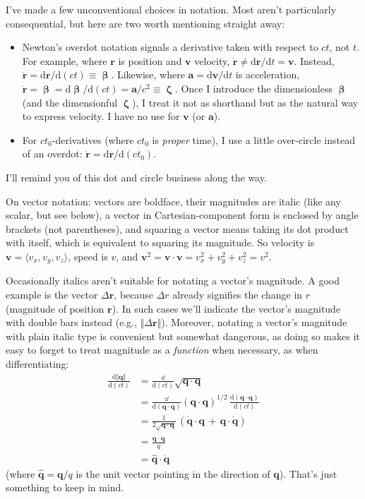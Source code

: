 \documentclass[12pt]{article}
\renewcommand{\vv}[1]{\mathbf{#1}}
\newcommand{\dd}[1]{\mathrm{d}#1}
\newcommand{\vvbeta}{\bm{\upbeta}}
\newcommand{\vvzeta}{\bm{\upzeta}}
\begin{document}
I've made a few unconventional choices in notation. Most aren't particularly consequential, but here are two worth mentioning straight away:
\begin{itemize}
\item Newton's overdot notation signals a derivative taken with respect to $ct$, not $t$. For example, where $\vv r$ is position and $\vv v$ velocity, ${\dot{\vv r} \neq \dd \vv r / \dd t = \vv v}$. Instead, $\dot{\vv r} = \dd \vv r / \dd (ct) \equiv \vvbeta$. Likewise, where $\vv a = \dd \vv v / \dd t$ is acceleration, $\ddot{\vv r} = \dot{\vvbeta} = \dd \vvbeta / \dd (ct) = \vv a / c^2 \equiv \vvzeta$. Once I introduce the dimensionless $\vvbeta$ (and the dimensionful $\vvzeta$), I treat it not as shorthand but as the natural way to express velocity. I have no use for $\vv v$ (or $\vv a$).
\item For $c t_0$-derivatives (where $ct_0$ is \emph{proper} time), I use a little over-circle instead of an overdot: $\mathring{\vv r} = \dd \vv r / \dd (c t_0)$.
\end{itemize}
I'll remind you of this dot and circle business along the way.

On vector notation: vectors are boldface, their magnitudes are italic (like any scalar, but see below), a vector in Cartesian-component form is enclosed by angle brackets (not parentheses), and squaring a vector means taking its dot product with itself, which is equivalent to squaring its magnitude. So velocity is $\vv v = \langle v_x, v_y, v_z \rangle$, speed is $v$, and $\vv v^2 = \vv v \cdot \vv v = v_x^2 + v_y^2 + v_z^2 = v^2$.

Occasionally italics aren't suitable for notating a vector's magnitude. A good example is the vector $\Delta \vv r$, because $\Delta r$ already signifies the change in $r$ (magnitude of position $\vv r$). In such cases we'll indicate the vector's magnitude with double bars instead (e.g., $\Vert \Delta \vv r \Vert$). Moreover, notating a vector's magnitude with plain italic type is convenient but somewhat dangerous, as doing so makes it easy to forget to treat magnitude as a \emph{function} when necessary, as when differentiating:
\begin{equation*}
\begin{aligned}
\frac{\dd \Vert \vv q \Vert}{\dd (ct)} &= \frac{\dd}{\dd (ct)} \sqrt{ \vv q \cdot \vv q } \\[2pt]
&= \frac{\dd}{\dd (\vv q \cdot \vv q)} \left( \vv q \cdot \vv q \right) ^{1/2} \, \frac{\dd (\vv q \cdot \vv q)}{\dd (ct)} \\[2pt]
&= \frac{1}{2 \sqrt{\vv q \cdot \vv q}} \, \left( \dot{\vv q} \cdot \vv q  \, + \, \vv q \cdot \dot{\vv q} \right) \\[4pt]
&= \frac{\vv q \cdot \dot{\vv q}}{q} \\[4pt]
&= \vv{ \hat q } \cdot \dot{ \vv q }
\end{aligned}
\end{equation*}
(where $\vv{ \hat q } = \vv q / q$ is the unit vector pointing in the direction of $\vv q$). That's just something to keep in mind.
\end{document}
